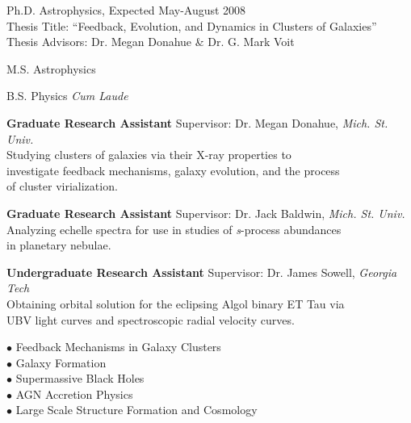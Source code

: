 \documentclass[11pt]{cv}
\begin{document}
\begin{llist}


Ph.D. Astrophysics, Expected May-August 2008\\
Thesis Title: ``Feedback, Evolution, and Dynamics in Clusters of Galaxies''\\
Thesis Advisors: Dr. Megan Donahue \& Dr. G. Mark Voit

M.S. Astrophysics

B.S. Physics {\it Cum Laude}


{\sc \bf{Graduate Research Assistant}}
Supervisor: Dr. Megan Donahue, {\textit{Mich. St. Univ.}}\\
Studying clusters of galaxies via their X-ray properties to\\
investigate feedback mechanisms, galaxy evolution, and the process\\
of cluster virialization.

{\sc \bf{Graduate Research Assistant}}
Supervisor: Dr. Jack Baldwin, {\textit{Mich. St. Univ.}}\\
Analyzing echelle spectra for use in studies of {\textit{s}}-process abundances\\
in planetary nebulae.

{\sc \bf{Undergraduate Research Assistant}}
Supervisor: Dr. James Sowell, {\textit{Georgia Tech}}\\
Obtaining orbital solution for the eclipsing Algol binary ET Tau via\\
UBV light curves and spectroscopic radial velocity curves.


{\sc $\bullet$ Feedback Mechanisms in Galaxy Clusters}\\
{\sc $\bullet$ Galaxy Formation}\\
{\sc $\bullet$ Supermassive Black Holes}\\
{\sc $\bullet$ AGN Accretion Physics}\\
{\sc $\bullet$ Large Scale Structure Formation and Cosmology}


\end{llist}
\end{document}
